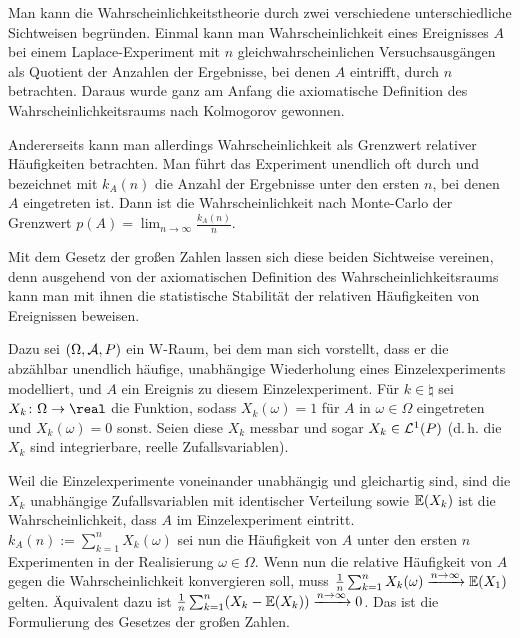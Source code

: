 \begin{Bem}
    Man kann die Wahrscheinlichkeitstheorie durch zwei verschiedene unterschiedliche Sichtweisen
    begründen.
    Einmal kann man Wahrscheinlichkeit eines Ereignisses $A$
    bei einem Laplace-Experiment mit $n$ gleichwahrscheinlichen Versuchsausgängen
    als Quotient der Anzahlen der Ergebnisse, bei denen $A$ eintrifft, durch $n$ betrachten.
    Daraus wurde ganz am Anfang die axiomatische Definition des Wahrscheinlichkeitsraums
    nach Kolmogorov gewonnen.

    Andererseits kann man allerdings Wahrscheinlichkeit als Grenzwert relativer Häufigkeiten
    betrachten.
    Man führt das Experiment unendlich oft durch und bezeichnet mit $k_A(n)$ die Anzahl der
    Ergebnisse unter den ersten $n$, bei denen $A$ eingetreten ist.
    Dann ist die Wahrscheinlichkeit nach Monte-Carlo der Grenzwert
    $p(A) = \lim_{n \to \infty} \frac{k_A(n)}{n}$.

    Mit dem Gesetz der großen Zahlen lassen sich diese beiden Sichtweise vereinen,
    denn ausgehend von der axiomatischen Definition des Wahrscheinlichkeitsraums kann man mit ihnen
    die statistische Stabilität der relativen Häufigkeiten von Ereignissen beweisen.

    Dazu sei $(\Omega, \mathcal{A}, P)$ ein W-Raum, bei dem man sich vorstellt, dass er
    die abzählbar unendlich häufige, unabhängige Wiederholung eines Einzelexperiments modelliert,
    und $A$ ein Ereignis zu diesem Einzelexperiment.
    Für $k \in \natural$ sei $X_k\colon \Omega \rightarrow \real$ die Funktion, sodass
    $X_k(\omega) = 1$ für $A$ in $\omega \in \Omega$ eingetreten und $X_k(\omega) = 0$ sonst.
    Seien diese $X_k$ messbar und sogar $X_k \in \mathcal{L}^1(P)$
    (d.\,h. die $X_k$ sind integrierbare, reelle Zufallsvariablen).

    Weil die Einzelexperimente voneinander unabhängig und gleichartig sind,
    sind die $X_k$ unabhängige Zufallsvariablen mit identischer Verteilung sowie
    $\mathbb{E}(X_k)$ ist die Wahrscheinlichkeit, dass $A$ im Einzelexperiment eintritt.
    $k_A(n) := \sum_{k=1}^n X_k(\omega)$ sei nun die Häufigkeit von $A$ unter den ersten
    $n$ Experimenten in der Realisierung $\omega \in \Omega$.
    Wenn nun die relative Häufigkeit von $A$ gegen die Wahrscheinlichkeit konvergieren soll,
    muss $\frac{1}{n} \sum_{k=1}^n X_k(\omega) \xrightarrow{n \to \infty} \mathbb{E}(X_1)$ gelten.
    Äquivalent dazu ist $\frac{1}{n} \sum_{k=1}^n (X_k - \mathbb{E}(X_k)) \xrightarrow{n \to \infty} 0$.
    Das ist die Formulierung des Gesetzes der großen Zahlen.
\end{Bem}

